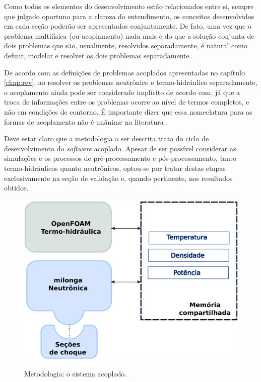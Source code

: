 Como todos os elementos do desenvolvimento estão relacionados entre si, sempre que
julgado oportuno para a clareza do entendimento, os conceitos desenvolvidos em cada
seção poderão ser apresentados conjuntamente. De fato, uma vez que o problema multifísica
(ou acoplamento) nada mais é do que a solução conjunta de dois problemas que são,
usualmente, resolvidos separadamente, é natural como definir, modelar e resolver os
dois problemas separadamente.

De acordo com as definições de problemas acoplados apresentadas
no capítulo \ref{chap:rev}, ao resolver os problemas neutrônico e termo-hidráulico
separadamente, o acoplamento ainda pode ser considerado implícito de acordo com, já que a troca de informações entre os problemas ocorre ao nível de termos completos,
e não em condições de contorno. É importante dizer que essa nomeclatura para as formas
de acoplamento não é unânime na literatura \cite{Ivanov2007}.

Deve estar claro que a metodologia a ser descrita trata do ciclo de desenvolvimento
do \textit{software} acoplado. Apesar de ser possível considerar as simulações e
os processos de pré-processamento e pós-processamento, tanto termo-hidráulicos quanto
neutrônicos, optou-se por tratar destas etapas exclusivamente na seção de validação e,
quando pertinente, nos resultados obtidos.

\begin{figure}[htb]
  \caption{Metodologia: o sistema acoplado.}
  \centering\includegraphics[scale=0.7]{figuras/metodologia1.png}
  \label{metodoetapas}
\end{figure}

